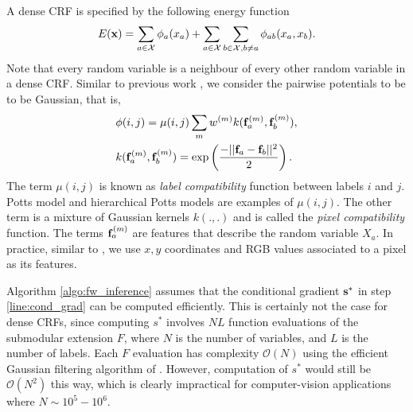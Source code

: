 \label{sec:dense_crf}

 A dense CRF is specified by the following energy function 
\begin{equation}
    E({\bf x}) = \sum_{a \in {\mathcal X}} \phi_a(x_a) + \sum_{a \in {\mathcal X}} \sum_{b \in {\mathcal X}, b \neq a} \phi_{ab}(x_a, x_b).
\end{equation}
Note that every random variable is a neighbour of every other random variable in a dense CRF. Similar to previous work \citep{koltun2011efficient}, we consider the pairwise potentials to be to be Gaussian, that is, 
\begin{align}
    &\phi(i, j) = \mu(i, j) \sum_{m} w^{(m)} k({\bf f}_a^{(m)}, {\bf f}_b^{(m)}), \\
    &k({\bf f}_a^{(m)}, {\bf f}_b^{(m)}) = \exp\left( \frac{- ||{\bf f}_a - {\bf f}_b ||^2}{2} \right).
\end{align}
The term $\mu(i,j)$ is known as {\it label compatibility} function between
labels $i$ and $j$. Potts model and hierarchical Potts models are examples of
$\mu(i, j)$. The other term is a mixture of Gaussian kernels $k(.,.)$ and is
called the {\it pixel compatibility} function. The terms ${\bf f}_a^{(m)}$ are
features that describe the random variable $X_a$. In practice, similar to
\citep{koltun2011efficient}, we use $x, y$ coordinates and RGB values
associated to a pixel as its features.

Algorithm \ref{algo:fw_inference} assumes that the conditional gradient $\bf s^*$ in step {\ref{line:cond_grad}} can be computed efficiently. This is certainly not the case for dense CRFs, since computing $s^*$ involves $NL$ function evaluations of the submodular extension $F$, where $N$ is the number of variables, and $L$ is the number of labels. Each $F$ evaluation has complexity ${\mathcal O}(N)$ using the efficient Gaussian filtering algorithm of \citep{koltun2011efficient}. However, computation of $s^*$ would still be ${\mathcal O} (N^2)$ this way, which is clearly impractical for computer-vision applications where $N \sim 10^5 - 10^6$.

